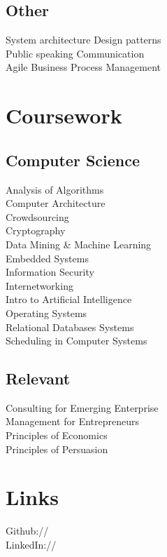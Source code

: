 \documentclass[]{deedy-resume-openfont}
\begin{document}
\begin{minipage}[t]{0.33\textwidth}
\subsection{Other}
System architecture \textbullet{} Design patterns\\
Public speaking \textbullet{} Communication\\
Agile Business Process Management
\sectionsep



\section{Coursework}
\subsection{Computer Science}
Analysis of Algorithms \\
Computer Architecture \\
Crowdsourcing \\
Cryptography \\
Data Mining \& Machine Learning \\
Embedded Systems \\
Information Security \\
Internetworking \\
Intro to Artificial Intelligence \\
Operating Systems \\
Relational Databases Systems \\
Scheduling in Computer Systems \\
\sectionsep

\subsection{Relevant}
Consulting for Emerging Enterprise \\
Management for Entrepreneurs \\
Principles of Economics \\
Principles of Persuasion \\
\sectionsep



\section{Links} 
Github:// \href{https://github.com/thenamanpat}{} \\
LinkedIn://  \href{https://www.linkedin.com/in/thenamanpat}{} \\
\sectionsep

%
%

\end{minipage} 
\end{document}
